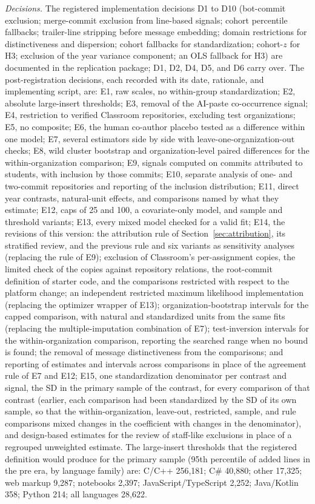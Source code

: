 \documentclass[acmsmall,screen,review,anonymous]{acmart}
\begin{document}
\textit{Decisions.} The registered implementation decisions D1 to D10 (bot-commit exclusion; merge-commit exclusion from line-based signals; cohort percentile fallbacks; trailer-line stripping before message embedding; domain restrictions for distinctiveness and dispersion; cohort fallbacks for standardization; cohort-$z$ for H3; exclusion of the year variance component; an OLS fallback for H3) are documented in the replication package; D1, D2, D4, D5, and D6 carry over. The post-registration decisions, each recorded with its date, rationale, and implementing script, are:
E1, raw scales, no within-group standardization;
E2, absolute large-insert thresholds;
E3, removal of the AI-paste co-occurrence signal;
E4, restriction to verified Classroom repositories, excluding test organizations;
E5, no composite;
E6, the human co-author placebo tested as a difference within one model;
E7, several estimators side by side with leave-one-organization-out checks;
E8, wild cluster bootstrap and organization-level paired differences for the within-organization comparison;
E9, signals computed on commits attributed to students, with inclusion by those commits;
E10, separate analysis of one- and two-commit repositories and reporting of the inclusion distribution;
E11, direct year contrasts, natural-unit effects, and comparisons named by what they estimate;
E12, caps of 25 and 100, a covariate-only model, and sample and threshold variants;
E13, every mixed model checked for a valid fit;
E14, the revisions of this version: the attribution rule of Section~\ref{sec:attribution}, its stratified review, and the previous rule and six variants as sensitivity analyses (replacing the rule of E9); exclusion of Classroom's per-assignment copies, the limited check of the copies against repository relations, the root-commit definition of starter code, and the comparisons restricted with respect to the platform change; an independent restricted maximum likelihood implementation (replacing the optimizer wrapper of E13); organization-bootstrap intervals for the capped comparison, with natural and standardized units from the same fits (replacing the multiple-imputation combination of E7); test-inversion intervals for the within-organization comparison, reporting the searched range when no bound is found; the removal of message distinctiveness from the comparisons; and reporting of estimates and intervals across comparisons in place of the agreement rule of E7 and E12;
E15, one standardization denominator per contrast and signal, the SD in the primary sample of the contrast, for every comparison of that contrast (earlier, each comparison had been standardized by the SD of its own sample, so that the within-organization, leave-out, restricted, sample, and rule comparisons mixed changes in the coefficient with changes in the denominator), and design-based estimates for the review of staff-like exclusions in place of a regrouped unweighted estimate.
The large-insert thresholds that the registered definition would produce for the primary sample (95th percentile of added lines in the pre era, by language family) are: C/C++ 256,181; C\# 40,880; other 17,325; web markup 9,287; notebooks 2,397; JavaScript/TypeScript 2,252; Java/Kotlin 358; Python 214; all languages 28,622.
\end{document}
